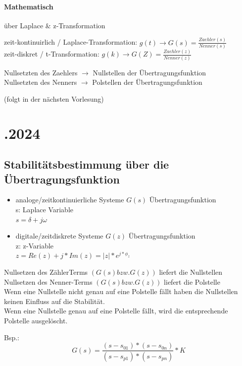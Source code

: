 \documentclass{article}
\begin{document}
\paragraph{Mathematisch} über Laplace $\&$ z-Transformation
\begin{center}
	zeit-kontinuirlich / Laplace-Transformation:  $g(t) \rightarrow G(s) = \frac{Zaehler(s)}{Nenner(s)}$ \\
	zeit-diskret / t-Transformation: $g(k) \rightarrow G(Z) = \frac{Zaehler(z)}{Nenner(z)}$
\end{center}
Nullsetzten des Zaehlers $\rightarrow$ Nullstellen der Übertragungsfunktion \\
Nullsetzten des Nenners $\rightarrow$ Polstellen der Übertragungsfunktion
\begin{center} (folgt in der nächsten Vorlesung) \end{center}

\newpage
\section*{.2024}
\subsection*{Stabilitätsbestimmung über die Übertragungsfunktion}
\begin{itemize}
	\item analoge/zeitkontinuierliche Systeme $G(s)$ Übertragungsfunktion \\
	s: Laplace Variable \\
	$s=\delta+j\omega$
	\item digitale/zeitdiskrete Systeme $G(z)$ Übertragungsfunktion \\
	z: z-Variable \\
	$z=Re(z) + j * Im(z) = |z| * e^{j*\phi_z} $
\end{itemize}
Nullsetzen des ZählerTerms $(G(s) bzw. G(z))$ liefert die Nullstellen \\
Nullsetzen des Nenner-Terms $(G(s) bzw. G(z))$ liefert die Polstelle \\
Wenn eine Nullstelle nicht genau auf eine Polstelle fällt haben die Nullstellen keinen Einfluss auf die Stabilität. \\
Wenn eine Nullstelle genau auf eine Polstelle fällt, wird die entsprechende Polstelle ausgelöscht.
\begin{center}
Bsp.:
\[
G(s) = \frac{ (s-s_{01}) * (s-s_{0n}) }{ (s-s_{p1}) * (s-s_{pn}) }*K
\]
\end{center}
\end{document}
